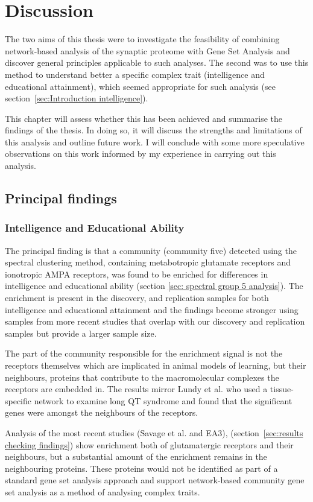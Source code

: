 \chapter{Discussion}

The two aims of this thesis were to investigate the feasibility of combining network-based analysis of the synaptic proteome with Gene Set Analysis and discover general principles applicable to such analyses. The second was to use this method to understand better a specific complex trait (intelligence and educational attainment), which seemed appropriate for such analysis (see section~\ref{sec:Introduction intelligence}).

This chapter will assess whether this has been achieved and summarise the findings of the thesis. In doing so, it will discuss the strengths and limitations of this analysis and outline future work. I will conclude with some more speculative observations on this work informed by my experience in carrying out this analysis.

\section{Principal findings}
\subsection{Intelligence and Educational Ability}
The principal finding is that a community (community five) detected using the spectral clustering method, containing metabotropic glutamate receptors and ionotropic AMPA receptors, was found to be enriched for differences in intelligence and educational ability (section \ref{sec: spectral group 5 analysis}). The enrichment is present in the discovery, and replication samples for both intelligence and educational attainment and the findings become stronger using samples from more recent studies that overlap with our discovery and replication samples but provide a larger sample size. 

The part of the community responsible for the enrichment signal is not the receptors themselves which are implicated in animal models of learning, but their neighbours, proteins that contribute to the macromolecular complexes the receptors are embedded in. The results mirror Lundy et al.\cite{lundby2014annotation} who used a tissue-specific network to examine long QT syndrome and found that the significant genes were amongst the neighbours of the receptors. 

Analysis of the most recent studies (Savage et al. and EA3)\cite{savage2018genome},\cite{lee2018gene} (section~\ref{sec:results checking findings}) show enrichment both of glutamatergic receptors and their neighbours, but a substantial amount of the enrichment remains in the neighbouring proteins. These proteins would not be identified as part of a standard gene set analysis approach and support network-based community gene set analysis as a method of analysing complex traits. 

